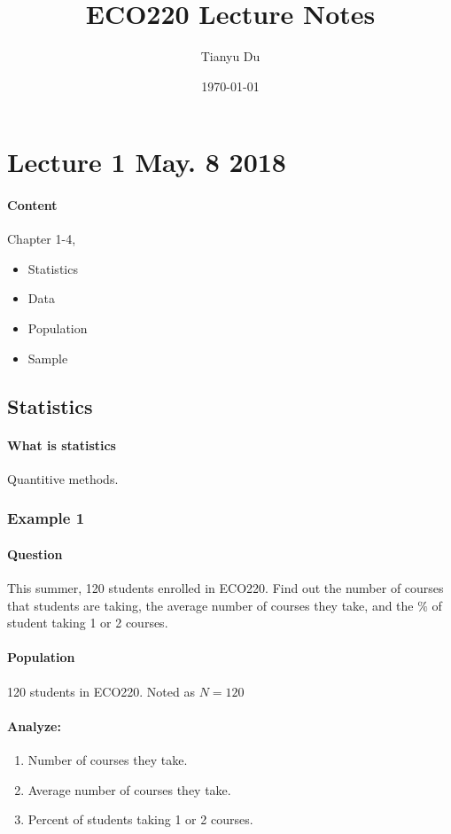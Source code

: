 \documentclass[11pt]{article}
\title{ECO220 Lecture Notes}
\author{Tianyu Du}
\date{\today}
\begin{document}
\maketitle
\tableofcontents

\section{Lecture 1 May. 8 2018}
\paragraph{Content} Chapter 1-4,
\begin{itemize}
	\item Statistics
	\item Data
	\item Population
	\item Sample
\end{itemize}

\subsection{Statistics}
\paragraph{What is statistics} Quantitive methods.
\subsubsection{Example 1}
	\paragraph{Question} This summer, 120 students enrolled in ECO220. Find out the number of courses that students are taking, the average number of courses they take, and the $\%$ of student taking 1 or 2 courses.

	\paragraph{Population} 120 students in ECO220. Noted as $N = 120$
	
	\paragraph{Analyze:}
	\begin{enumerate}
		\item Number of courses they take.
		\item Average number of courses they take.
		\item Percent of students taking 1 or 2 courses.
	\end{enumerate}
	
\end{document}
